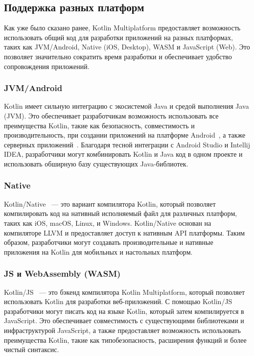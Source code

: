 \documentclass[14pt, russian]{scrartcl}
\begin{document}
\subsection{Поддержка разных платформ}

Как уже было сказано ранее, Kotlin Multiplatform предоставляет возможность использовать общий код для разработки приложений на разных платформах, таких как JVM/Android, Native (iOS, Desktop), WASM и JavaScript (Web). Это позволяет значительно сократить время разработки и обеспечивает удобство сопровождения приложений.

\subsubsection{JVM/Android}

Kotlin имеет сильную интеграцию с экосистемой Java и средой выполнения Java (JVM). Это обеспечивает разработчикам возможность использовать все преимущества Kotlin, такие как безопасность, совместимость и производительность, при создании приложений на платформе Android~\cite{KotlinAndroid}, а также серверных приложений~\cite{KotlinServer}. Благодаря тесной интеграции с Android Studio и Intellij IDEA, разработчики могут комбинировать Kotlin и Java код в одном проекте и использовать обширную базу существующих Java-библиотек.

\subsubsection{Native}

Kotlin/Native~\cite{KotlinNative} --- это вариант компилятора Kotlin, который позволяет компилировать код на нативный исполняемый файл для различных платформ, таких как iOS, macOS, Linux, и Windows. Kotlin/Native основан на компиляторе LLVM и предоставляет доступ к нативным API платформы. Таким образом, разработчики могут создавать производительные и нативные приложения на Kotlin для мобильных и настольных платформ.

\subsubsection{JS и WebAssembly (WASM)} %

Kotlin/JS~\cite{KotlinJS} --- это бэкенд компилятора Kotlin Multiplatform, который позволяет использовать Kotlin для разработки веб-приложений. С помощью Kotlin/JS разработчики могут писать код на языке Kotlin, который затем компилируется в JavaScript. Это обеспечивает совместимость с существующими библиотеками и инфраструктурой JavaScript, а также предоставляет возможность использовать преимущества Kotlin, такие как типобезопасность, расширения функций и более чистый синтаксис.
\end{document}
